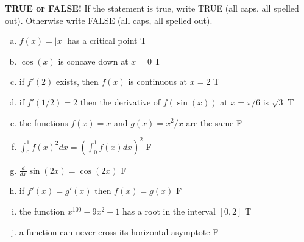 \documentclass[11pt]{exam}
\theoremstyle{definition}
\begin{document}
\begin{questions}

\addpoints

\question[20]\mbox{}
\textbf{TRUE or FALSE!}
If the statement is true, write TRUE (all caps, all spelled out).
Otherwise write FALSE (all caps, all spelled out).
\begin{enumerate}[(a)]
\item $f(x) = |x|$ has a critical point
T
\item $\cos(x)$ is concave down at $x=0$
T
\item if $f'(2)$ exists, then $f(x)$ is continuous at $x=2$
T
\item if $f'(1/2) = 2$ then the derivative of $f(\sin(x))$ at $x=\pi/6$ is  $\sqrt{3}$
T
\item the functions $f(x) = x$ and $g(x) = x^2/x$ are the same
F
\item $\int_0^1 f(x)^2dx = \left(\int_0^1 f(x) dx\right)^2$
F
\item $\frac{d}{dx}\sin(2x) = \cos(2x)$
F
\item if $f'(x) = g'(x)$ then $f(x) = g(x)$
F
\item the function $x^{100}-9x^2 + 1$ has a root in the interval $[0,2]$
T
\item a function can never cross its horizontal asymptote
F
\end{enumerate}


\end{questions}
\end{document}
